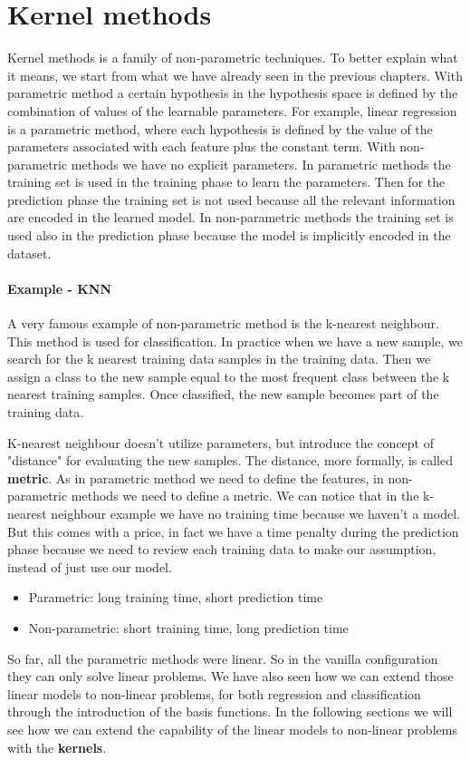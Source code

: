 \documentclass[../main.tex]{subfiles}
\begin{document}
\section{Kernel methods}
Kernel methods is a family of non-parametric techniques. To better explain what it means, we start from what we have already seen in the previous chapters. With parametric method a certain hypothesis in the hypothesis space is defined by the combination of values of the learnable parameters. For example, linear regression is a parametric method, where each hypothesis is defined by the value of the parameters associated with each feature plus the constant term.
With non-parametric methods we have no explicit parameters. %
In parametric methods the training set is used in the training phase to learn the parameters. Then for the prediction phase the training set is not used because all the relevant information are encoded in the learned model. In non-parametric methods the training set is used also in the prediction phase because the model is implicitly encoded in the dataset.
\paragraph{Example - KNN} A very famous example of non-parametric method is the k-nearest neighbour\footnotemark. This method is used for classification. In practice when we have a new sample, we search for the k nearest training data samples in the training data. Then we assign a class to the new sample equal to the most frequent class between the k nearest training samples. Once classified, the new sample becomes part of the training data. 

K-nearest neighbour doesn't utilize parameters, but introduce the concept of "distance" for evaluating the new samples. The distance, more formally, is called \textbf{metric}. As in parametric method we need to define the features, in non-parametric methods we need to define a metric.
We can notice that in the k-nearest neighbour example we have no training time because we haven't a model. But this comes with a price, in fact we have a time penalty during the prediction phase because we need to review each training data to make our assumption, instead of just use our model.
\begin{itemize}
    \item Parametric: long training time, short prediction time
    \item Non-parametric: short training time, long prediction time
\end{itemize}
So far, all the parametric methods were linear. So in the vanilla configuration they can only solve linear problems. We have also seen how we can extend those linear models to non-linear problems, for both regression and classification through the introduction of the basis functions. In the following sections we will see how we can extend the capability of the linear models to non-linear problems with the \textbf{kernels}.
\end{document}
